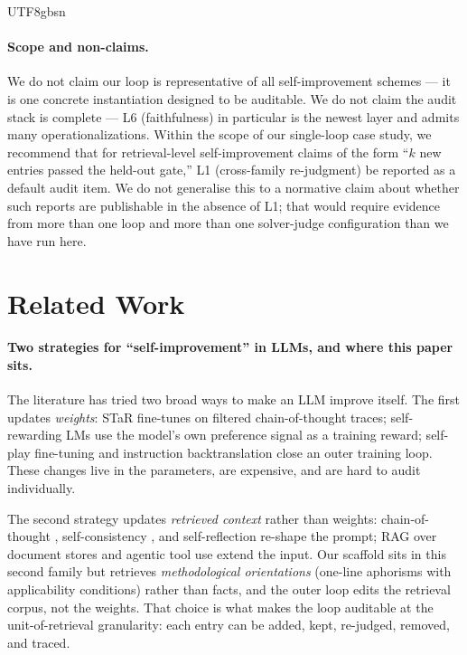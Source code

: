 \documentclass{article}
\begin{document}
\begin{CJK*}{UTF8}{gbsn}
\paragraph{Scope and non-claims.} We do not claim our loop is
representative of all self-improvement schemes — it is one concrete
instantiation designed to be auditable. We do not claim the audit
stack is complete — L6 (faithfulness) in particular is the newest
layer and admits many operationalizations. Within the scope of our
single-loop case study, we recommend that for retrieval-level
self-improvement claims of the form ``\(k\) new entries passed the
held-out gate,'' L1 (cross-family re-judgment) be reported as a
default audit item. We do not generalise this to a normative claim
about whether such reports are publishable in the absence of L1;
that would require evidence from more than one loop and more than
one solver-judge configuration than we have run here.

\section{Related Work}
\label{sec:related}

\paragraph{Two strategies for ``self-improvement'' in LLMs, and where
this paper sits.} The literature has tried two broad ways to make
an LLM improve itself. The first updates \emph{weights}: STaR
\citep{zelikman2022star,zelikman2024star} fine-tunes on filtered
chain-of-thought traces; self-rewarding LMs
\citep{yuan2024selfrewarding} use the model's own preference signal
as a training reward; self-play fine-tuning \citep{chen2024selfplay}
and instruction backtranslation \citep{li2024backtrans} close an
outer training loop. These changes live in the parameters, are
expensive, and are hard to audit individually.

The second strategy updates \emph{retrieved context} rather than
weights: chain-of-thought \citep{wei2022chain}, self-consistency
\citep{wang2023selfcons}, and self-reflection
\citep{madaan2023selfrefine,shinn2023reflexion} re-shape the
prompt; RAG over document stores
\citep{lewis2020rag,borgeaud2022retro} and agentic tool use
\citep{yao2023react,schick2024toolformer} extend the input. Our
scaffold sits in this second family but retrieves \emph{methodological
orientations} (one-line aphorisms with applicability conditions)
rather than facts, and the outer loop edits the retrieval corpus,
not the weights. That choice is what makes the loop auditable at
the unit-of-retrieval granularity: each entry can be added, kept,
re-judged, removed, and traced.


\end{CJK*}
\end{document}
